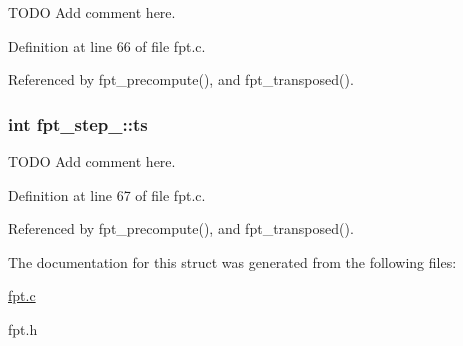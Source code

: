 T\-O\-D\-O Add comment here. 



Definition at line 66 of file fpt.\-c.



Referenced by fpt\-\_\-precompute(), and fpt\-\_\-transposed().

\hypertarget{structfpt__step___aeb754fe2aedc1f15cbb9c75c212772fb}{
\subsubsection[{ts}]{\setlength{\rightskip}{0pt plus 5cm}int fpt\-\_\-step\-\_\-\-::ts}}\label{structfpt__step___aeb754fe2aedc1f15cbb9c75c212772fb}


T\-O\-D\-O Add comment here. 



Definition at line 67 of file fpt.\-c.



Referenced by fpt\-\_\-precompute(), and fpt\-\_\-transposed().



The documentation for this struct was generated from the following files\-:\begin{DoxyCompactItemize}
\item 
\hyperlink{fpt_8c}{fpt.\-c}\item 
fpt.\-h\end{DoxyCompactItemize}
